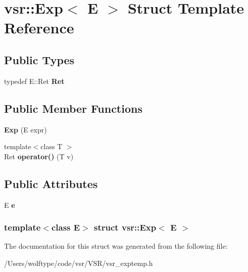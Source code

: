 \hypertarget{structvsr_1_1_exp}{\section{vsr\-:\-:Exp$<$ E $>$ Struct Template Reference}
\label{structvsr_1_1_exp}
}
\subsection*{Public Types}
\begin{DoxyCompactItemize}
\item 
\hypertarget{structvsr_1_1_exp_ab49a900d4e42add2e8a07a173d103839}{typedef E\-::\-Ret {\bfseries Ret}}\label{structvsr_1_1_exp_ab49a900d4e42add2e8a07a173d103839}

\end{DoxyCompactItemize}
\subsection*{Public Member Functions}
\begin{DoxyCompactItemize}
\item 
\hypertarget{structvsr_1_1_exp_a713610fa4f9793c5f57d0bfb13e602cf}{{\bfseries Exp} (E expr)}\label{structvsr_1_1_exp_a713610fa4f9793c5f57d0bfb13e602cf}

\item 
\hypertarget{structvsr_1_1_exp_aef28362f056bddbc2a4084e9fb734866}{{\footnotesize template$<$class T $>$ }\\Ret {\bfseries operator()} (T v)}\label{structvsr_1_1_exp_aef28362f056bddbc2a4084e9fb734866}

\end{DoxyCompactItemize}
\subsection*{Public Attributes}
\begin{DoxyCompactItemize}
\item 
\hypertarget{structvsr_1_1_exp_afb6a71a9be805e1c88639a6ce98231eb}{E {\bfseries e}}\label{structvsr_1_1_exp_afb6a71a9be805e1c88639a6ce98231eb}

\end{DoxyCompactItemize}
\subsubsection*{template$<$class E$>$ struct vsr\-::\-Exp$<$ E $>$}



The documentation for this struct was generated from the following file\-:\begin{DoxyCompactItemize}
\item 
/\-Users/wolftype/code/vsr/\-V\-S\-R/vsr\-\_\-exptemp.\-h\end{DoxyCompactItemize}
